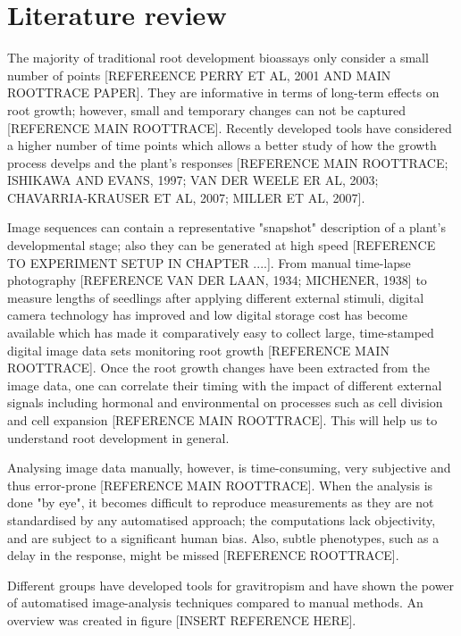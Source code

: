 \section{Literature review}

The majority of traditional root development bioassays only consider a small number of points [REFEREENCE PERRY ET AL, 2001 AND MAIN ROOTTRACE PAPER]. They are informative in terms of long-term effects on root growth; however, small and temporary changes can not be captured [REFERENCE MAIN ROOTTRACE].
Recently developed tools have considered a higher number of time points which allows a better study of how the growth process develps and the plant's responses [REFERENCE MAIN ROOTTRACE; ISHIKAWA AND EVANS, 1997; VAN DER WEELE ER AL, 2003; CHAVARRIA-KRAUSER ET AL, 2007; MILLER ET AL, 2007].  

Image sequences can contain a representative "snapshot" description of a plant's developmental stage; also they can be generated at high speed [REFERENCE TO EXPERIMENT SETUP IN CHAPTER ....]. From manual time-lapse photography [REFERENCE VAN DER LAAN, 1934; MICHENER, 1938] to measure lengths of seedlings after applying different external stimuli, digital camera  technology has improved and low digital storage cost has become available which has made it comparatively easy to collect large, time-stamped digital image data sets monitoring root growth [REFERENCE MAIN ROOTTRACE].  
Once the root growth changes have been extracted from the image data, one can correlate their timing with the impact of different external signals including hormonal and environmental on processes such as cell division and cell expansion [REFERENCE MAIN ROOTTRACE]. This will help us to understand root development in general. 

Analysing image data manually, however, is time-consuming, very subjective and thus error-prone [REFERENCE MAIN ROOTTRACE]. When the analysis is done "by eye", it becomes difficult to reproduce measurements as they are not standardised by any automatised approach; the computations lack objectivity, and are subject to a significant human bias. Also, subtle phenotypes, such as a delay in the response, might be missed [REFERENCE ROOTTRACE]. 

Different groups have developed tools for gravitropism and have shown the power of automatised image-analysis techniques compared to manual methods. An overview was created in figure [INSERT REFERENCE HERE].


